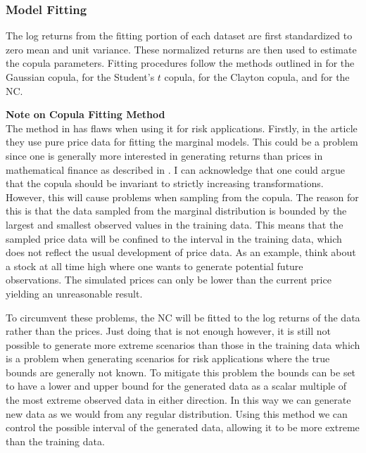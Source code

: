 \subsubsection{Model Fitting}
The log returns from the fitting portion of each dataset are first standardized to zero mean and unit variance. These normalized returns are then used to estimate the copula parameters. Fitting procedures follow the methods outlined in  for the Gaussian copula,  for the Student's $t$ copula,  for the Clayton copula, and  for the \gls{NC}.

\begin{remark}
    \textbf{Note on Copula Fitting Method}\\
    The method in  has flaws when using it for risk applications. Firstly, in the article they use pure price data for fitting the marginal models. This could be a problem since one is generally more interested in generating returns than prices in mathematical finance as described in . I can acknowledge that one could argue that the copula should be invariant to strictly increasing transformations. However, this will cause problems when sampling from the copula. The reason for this is that the data sampled from the marginal distribution is bounded by the largest and smallest observed values in the training data. This means that the sampled price data will be confined to the interval in the training data, which does not reflect the usual development of price data. As an example, think about a stock at all time high where one wants to generate potential future observations. The simulated prices can only be lower than the current price yielding an unreasonable result. 
    
    To circumvent these problems, the \gls{NC} will be fitted to the log returns of the data rather than the prices. Just doing that is not enough however, it is still not possible to generate more extreme scenarios than those in the training data which is a problem when generating scenarios for risk applications where the true bounds are generally not known. To mitigate this problem the bounds can be set to have a lower and upper bound for the generated data as a scalar multiple of the most extreme observed data in either direction. In this way we can generate new data as we would from any regular distribution. Using this method we can control the possible interval of the generated data, allowing it to be more extreme than the training data. 
\end{remark}


